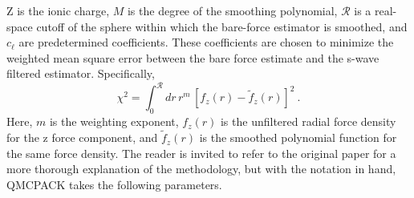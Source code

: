 Z is the ionic charge, $M$ is the degree of the smoothing polynomial, $\mathcal{R}$ is a real-space cutoff of the sphere within which the bare-force estimator is smoothed, and $c_\ell$ are predetermined coefficients.  These coefficients are chosen to minimize the weighted mean square error between the bare force estimate and the s-wave filtered estimator.  Specifically, 
\begin{equation}
\chi^2 = \int_0^\mathcal{R}dr\,r^m\,[f_z(r) - \tilde{f}_z(r)]^2\:.
\end{equation}
Here, $m$ is the weighting exponent, $f_z(r)$ is the unfiltered radial force density for the z force component, and $\tilde{f}_z(r)$ is the smoothed polynomial function for the same force density.  The reader is invited to refer to the original paper for a more thorough explanation of the methodology, but with the notation in hand, QMCPACK takes the following parameters.
\FloatBarrier
